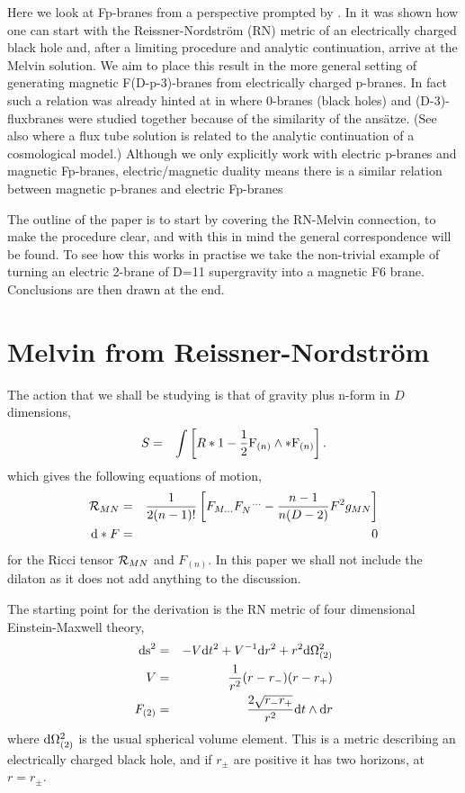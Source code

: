 \documentclass[a4paper,11pt]{article}
\begin{document}
Here we look at Fp-branes from a perspective prompted by \cite{gibbons01}.
In \cite{gibbons01} it was shown how one can start
with the Reissner-Nordstr\"{o}m (RN) 
metric of an electrically charged
black hole and, after a limiting procedure and analytic
continuation, arrive at the Melvin solution.
We aim to place this result in the more general setting of generating
magnetic F(D-p-3)-branes from electrically charged p-branes.
In fact such a relation was already hinted at in \cite{gibbons88} where
0-branes (black holes) and (D-3)-fluxbranes were studied together because
of the similarity of the ans\"{a}tze.
(See also \cite{gibbons87} where a flux tube solution is related to the
analytic continuation of a cosmological model.)
 Although we only explicitly work
with electric p-branes and magnetic Fp-branes, electric/magnetic duality
means there is a similar relation between 
magnetic p-branes and electric Fp-branes

The outline of the paper is to start by covering the RN-Melvin connection,
to make the procedure clear, and with this in mind the general 
correspondence will be found. To see how this works in practise we take
the non-trivial example of turning an electric 2-brane of D=11 
supergravity
into a magnetic F6 brane. Conclusions are then drawn at the end.

\setcounter{equation}{0}
\section{Melvin from Reissner-Nordstr\"{o}m}

The action that we shall be studying is that of gravity plus n-form
in $D$ dimensions,
\begin{eqnarray}
S&=&\int\left[R *1-\frac{1}{2}{\rm F}_{(n)}\wedge *{\rm F}_{(n)}\right].
\end{eqnarray}
which gives the following equations of motion,
\begin{eqnarray}
{\cal R}_{MN}&=&\frac{1}{2(n-1)!}\left[F_{M...}F_N^{\;\;\;...}
                 -\frac{n-1}{n(D-2)}F^2g_{MN}\right]\\
{\rm d}*F&=&0
\end{eqnarray}
for the Ricci tensor ${\cal R}_{MN}$ and $F_{(n)}$.
In this paper we shall not include the dilaton as it does not add
anything to the discussion.

The starting point for the derivation is the RN metric of four dimensional
Einstein-Maxwell theory,
\begin{eqnarray}
{\rm ds}^2&=&-V{\rm d}t^2+V^{-1}{\rm d}r^2+r^2{\rm d}\Omega_{(2)}^2\\
\label{Vfunc}
V&=&\frac{1}{r^2}(r-r_-)(r-r_+)\\
F_{(2)}&=&\frac{2\sqrt{r_- r_+}}{r^2}{\rm d}t\wedge{\rm d}r
\end{eqnarray}
where ${\rm d}\Omega_{(2)}^2$ is the usual spherical volume element.
This is a metric describing an electrically charged black hole, and
if $r_\pm$ are positive it has two horizons, at $r=r_\pm$.
\end{document}
